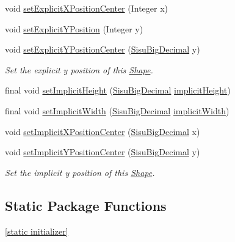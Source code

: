 \begin{DoxyCompactItemize}
\item 
void \hyperlink{classcom_1_1aarrelaakso_1_1drawl_1_1_shape_aa7855df6d98b3bfa556b7d857755181b}{set\+Explicit\+X\+Position\+Center} (Integer x)
\item 
void \hyperlink{classcom_1_1aarrelaakso_1_1drawl_1_1_shape_af8af5129e3e61324439a1035428016a2}{set\+Explicit\+Y\+Position} (Integer y)
\item 
void \hyperlink{classcom_1_1aarrelaakso_1_1drawl_1_1_shape_a0ddc58345fca924e973fac474955ef14}{set\+Explicit\+Y\+Position\+Center} (\hyperlink{classcom_1_1aarrelaakso_1_1drawl_1_1_sisu_big_decimal}{Sisu\+Big\+Decimal} y)
\begin{DoxyCompactList}\small\item\em Set the explicit y position of this \hyperlink{classcom_1_1aarrelaakso_1_1drawl_1_1_shape}{Shape}. \end{DoxyCompactList}\item 
final void \hyperlink{classcom_1_1aarrelaakso_1_1drawl_1_1_shape_ad41ecfc8ce74638066d8a21c97e3f399}{set\+Implicit\+Height} (\hyperlink{classcom_1_1aarrelaakso_1_1drawl_1_1_sisu_big_decimal}{Sisu\+Big\+Decimal} \hyperlink{classcom_1_1aarrelaakso_1_1drawl_1_1_shape_ab374c520d98692018b1a5866acd33849}{implicit\+Height})
\item 
final void \hyperlink{classcom_1_1aarrelaakso_1_1drawl_1_1_shape_a6ec4c2bd26d08f0a1545bd1d5f47c05a}{set\+Implicit\+Width} (\hyperlink{classcom_1_1aarrelaakso_1_1drawl_1_1_sisu_big_decimal}{Sisu\+Big\+Decimal} \hyperlink{classcom_1_1aarrelaakso_1_1drawl_1_1_shape_a100066b3ccbb6e88080211b00ad8ebb9}{implicit\+Width})
\item 
void \hyperlink{classcom_1_1aarrelaakso_1_1drawl_1_1_shape_a4fbc0d430cfe312e018e4ec58f726842}{set\+Implicit\+X\+Position\+Center} (\hyperlink{classcom_1_1aarrelaakso_1_1drawl_1_1_sisu_big_decimal}{Sisu\+Big\+Decimal} x)
\item 
void \hyperlink{classcom_1_1aarrelaakso_1_1drawl_1_1_shape_ac1cf4cf6f0bcc489b996a10a600d5629}{set\+Implicit\+Y\+Position\+Center} (\hyperlink{classcom_1_1aarrelaakso_1_1drawl_1_1_sisu_big_decimal}{Sisu\+Big\+Decimal} y)
\begin{DoxyCompactList}\small\item\em Set the implicit y position of this \hyperlink{classcom_1_1aarrelaakso_1_1drawl_1_1_shape}{Shape}. \end{DoxyCompactList}\end{DoxyCompactItemize}
\subsection*{Static Package Functions}
\begin{DoxyCompactItemize}
\item 
\hyperlink{classcom_1_1aarrelaakso_1_1drawl_1_1_shape_ad2adcb85374cf5d6d59429628314e8d1}{\mbox{[}static initializer\mbox{]}}
\end{DoxyCompactItemize}


